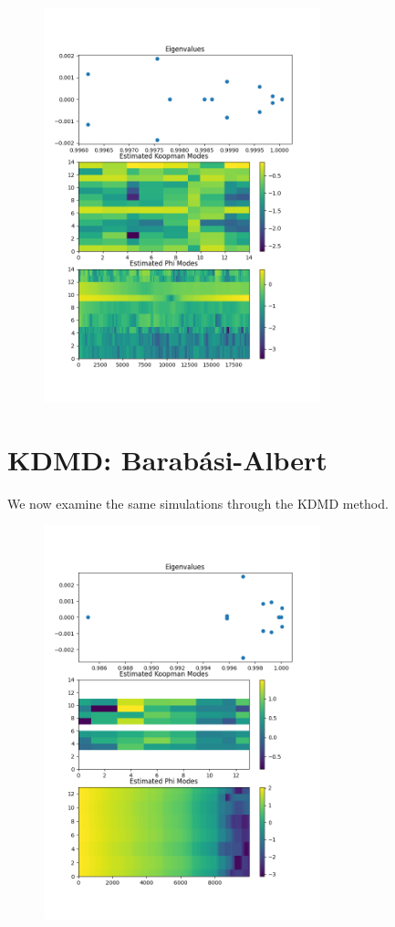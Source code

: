 \begin{figure}
    \includegraphics[width=8cm]{Images/m2k300eigen.png}
    \centering
\end{figure}

\FloatBarrier

\section{KDMD: Barabási-Albert}

We now examine the same simulations through the KDMD method.

\FloatBarrier
\begin{figure}
    \includegraphics[width=8cm]{Images/KDMDm1k300eigen.png}
    \centering
\end{figure}

